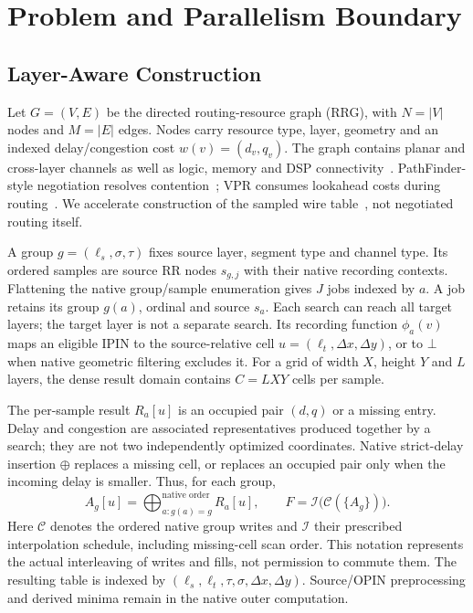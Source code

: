 \section{Problem and Parallelism Boundary}
\subsection{Layer-Aware Construction}
Let $G=(V,E)$ be the directed routing-resource graph (RRG), with $N=|V|$ nodes and $M=|E|$ edges. Nodes carry resource type, layer, geometry and an indexed delay/congestion cost $w(v)=(d_v,q_v)$. The graph contains planar and cross-layer channels as well as logic, memory and DSP connectivity~\cite{third_dimension,multidie}. PathFinder-style negotiation resolves contention~\cite{pathfinder}; VPR consumes lookahead costs during routing~\cite{vtr8,vtr9}. We accelerate construction of the sampled wire table~\cite{diversity}, not negotiated routing itself.

A group $g=(\ell_s,\sigma,\tau)$ fixes source layer, segment type and channel type. Its ordered samples are source RR nodes $s_{g,j}$ with their native recording contexts. Flattening the native group/sample enumeration gives $J$ jobs indexed by $a$. A job retains its group $g(a)$, ordinal and source $s_a$. Each search can reach all target layers; the target layer is not a separate search. Its recording function $\phi_a(v)$ maps an eligible IPIN to the source-relative cell $u=(\ell_t,\Delta x,\Delta y)$, or to $\bot$ when native geometric filtering excludes it. For a grid of width $X$, height $Y$ and $L$ layers, the dense result domain contains $C=LXY$ cells per sample.

The per-sample result $R_a[u]$ is an occupied pair $(d,q)$ or a missing entry. Delay and congestion are associated representatives produced together by a search; they are not two independently optimized coordinates. Native strict-delay insertion $\oplus$ replaces a missing cell, or replaces an occupied pair only when the incoming delay is smaller. Thus, for each group,
\begin{equation}
 A_g[u]=\mathop{\bigoplus}_{a:g(a)=g}^{\text{native order}}R_a[u],\qquad
 F=\mathcal I\bigl(\mathcal C(\{A_g\})\bigr).
\end{equation}
Here $\mathcal C$ denotes the ordered native group writes and $\mathcal I$ their prescribed interpolation schedule, including missing-cell scan order. This notation represents the actual interleaving of writes and fills, not permission to commute them. The resulting table is indexed by $(\ell_s,\ell_t,\tau,\sigma,\Delta x,\Delta y)$. Source/OPIN preprocessing and derived minima remain in the native outer computation.

